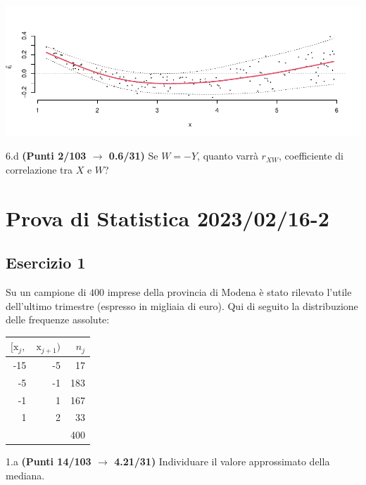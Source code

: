 \documentclass[
  11pt,
]{book}
\theoremstyle{mytheoremstyle}
\theoremstyle{mydefstyle}
\newenvironment{sol}
  {
  \begin{tcolorbox}[enhanced,breakable,arc=0.1mm,boxrule=1pt,colback=white,colframe=iblue,
  title=\bf \fontfamily{lmss}\selectfont \hspace{.5 cm} Soluzione,drop fuzzy shadow]

}{
\end{tcolorbox}
  }
\begin{document}
\begin{sol}

\begin{center}\includegraphics{Esami_passati_con_soluzioni_files/figure-latex/2023-19,-1} \end{center}

\end{sol}

6.d \textbf{(Punti 2/103 \(\rightarrow\) 0.6/31)} Se \(W=- Y\), quanto varrà \(r_{XW}\), coefficiente di correlazione tra \(X\) e \(W\)?

\section{Prova di Statistica 2023/02/16-2}\label{prova-di-statistica-20230216-2}

\subsection{Esercizio 1}\label{esercizio-1-24}

Su un campione di \(400\) imprese della provincia di Modena è stato rilevato l'utile dell'ultimo trimestre (espresso in migliaia di euro). Qui di seguito la distribuzione delle frequenze assolute:

\begin{table}[H]
\centering
\begin{tabular}{rrr}
\toprule
$[\text{x}_j,$ & $\text{x}_{j+1})$ & $n_j$\\
\midrule
-15 & -5 & 17\\
-5 & -1 & 183\\
-1 & 1 & 167\\
1 & 2 & 33\\
 &  & 400\\
\bottomrule
\end{tabular}
\end{table}

1.a \textbf{(Punti 14/103 \(\rightarrow\) 4.21/31)} Individuare il valore approssimato della mediana.
\end{document}
